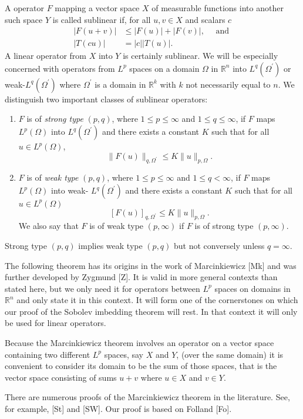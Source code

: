 \begin{para}
  A operator $F$ mapping a vector space $X$ of measurable functions into another such
  space $Y$ is called sublinear if, for all $u, v \in X$ and scalars $c$
  \begin{align*}
    |F(u+v)| & \leq|F(u)|+|F(v)|, \quad \text { and } \\
    |T(c u)| & =|c||T(u)| .
  \end{align*}
  A linear operator from $X$ into $Y$ is certainly sublinear.
  We will be especially concerned with operators from $L^p$ spaces on a domain $\Omega$
  in $\mathbb{R}^n$ into $L^q\left(\Omega^{\prime}\right)$ or weak-$L^q\left(\Omega^{\prime}\right)$
  where $\Omega^{\prime}$ is a domain in $\mathbb{R}^k$ with $k$ not necessarily equal to $n$.
  We distinguish two important classes of sublinear operators:
  \begin{enumerate}[label = (\alph*)]
    \item $F$ is of \emph{strong type} $(p, q)$, where $1 \leq p \leq \infty$ and $1 \leq q \leq \infty$, 
      if $F$ maps $L^p(\Omega)$ into $L^q\left(\Omega^{\prime}\right)$ and there exists a constant $K$ 
      such that for all $u \in L^p(\Omega)$,
      \[ \|F(u)\|_{q, \Omega^{\prime}} \leq K\|u\|_{p, \Omega}. \]
    \item $F$ is of \emph{weak type} $(p, q)$, where $1 \leq p \leq \infty$ and $1 \leq q<\infty$,
      if $F$ maps $L^p(\Omega)$ into weak- $L^q\left(\Omega^{\prime}\right)$ and there exists a constant 
      $K$ such that for all $u \in L^p(\Omega)$
      \[ [F(u)]_{q, \Omega^{\prime}} \leq K\|u\|_{p, \Omega}. \]
      We also say that $F$ is of weak type $(p, \infty)$ if $F$ is of strong type $(p, \infty)$.
  \end{enumerate}
  Strong type $(p, q)$ implies weak type $(p, q)$ but not conversely unless $q=\infty$.
\end{para}

\begin{para}
  The following theorem has its origins in the work of Marcinkiewicz [Mk]
  and was further developed by Zygmund [Z]. It is valid in more general
  contexts than stated here, but we only need it for operators between
  $L^p$ spaces on domains in $\mathbb{R}^n$ and only state it in this context.
  It will form one of the cornerstones on which our proof of the Sobolev
  imbedding theorem will rest. In that context it will only be used for linear operators.
  
  Because the Marcinkiewicz theorem involves an operator on a vector space
  containing two different $L^p$ spaces, say $X$ and $Y$, (over the same domain)
  it is convenient to consider its domain to be the sum of those spaces,
  that is the vector space consisting of sums $u+v$ where $u \in X$ and $v \in Y$.

  There are numerous proofs of the Marcinkiewicz theorem in the literature.
  See, for example, [St] and [SW]. Our proof is based on Folland [Fo].
\end{para}


